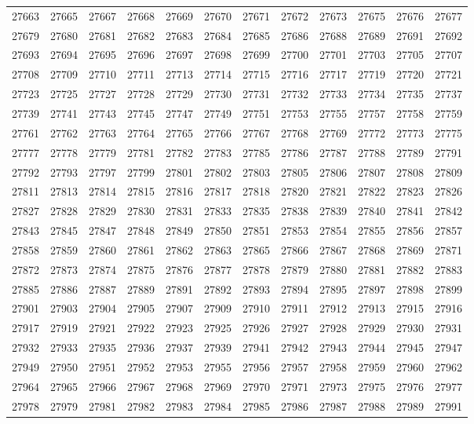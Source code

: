 \begin{center}
\begin{longtable}{llllllllllll}
27663 &27665 &27667 &27668 &27669 &27670 &27671 &27672 &27673 &27675 &27676 &27677 \\
27679 &27680 &27681 &27682 &27683 &27684 &27685 &27686 &27688 &27689 &27691 &27692 \\
27693 &27694 &27695 &27696 &27697 &27698 &27699 &27700 &27701 &27703 &27705 &27707 \\
27708 &27709 &27710 &27711 &27713 &27714 &27715 &27716 &27717 &27719 &27720 &27721 \\
27723 &27725 &27727 &27728 &27729 &27730 &27731 &27732 &27733 &27734 &27735 &27737 \\
27739 &27741 &27743 &27745 &27747 &27749 &27751 &27753 &27755 &27757 &27758 &27759 \\
27761 &27762 &27763 &27764 &27765 &27766 &27767 &27768 &27769 &27772 &27773 &27775 \\
27777 &27778 &27779 &27781 &27782 &27783 &27785 &27786 &27787 &27788 &27789 &27791 \\
27792 &27793 &27797 &27799 &27801 &27802 &27803 &27805 &27806 &27807 &27808 &27809 \\
27811 &27813 &27814 &27815 &27816 &27817 &27818 &27820 &27821 &27822 &27823 &27826 \\
27827 &27828 &27829 &27830 &27831 &27833 &27835 &27838 &27839 &27840 &27841 &27842 \\
27843 &27845 &27847 &27848 &27849 &27850 &27851 &27853 &27854 &27855 &27856 &27857 \\
27858 &27859 &27860 &27861 &27862 &27863 &27865 &27866 &27867 &27868 &27869 &27871 \\
27872 &27873 &27874 &27875 &27876 &27877 &27878 &27879 &27880 &27881 &27882 &27883 \\
27885 &27886 &27887 &27889 &27891 &27892 &27893 &27894 &27895 &27897 &27898 &27899 \\
27901 &27903 &27904 &27905 &27907 &27909 &27910 &27911 &27912 &27913 &27915 &27916 \\
27917 &27919 &27921 &27922 &27923 &27925 &27926 &27927 &27928 &27929 &27930 &27931 \\
27932 &27933 &27935 &27936 &27937 &27939 &27941 &27942 &27943 &27944 &27945 &27947 \\
27949 &27950 &27951 &27952 &27953 &27955 &27956 &27957 &27958 &27959 &27960 &27962 \\
27964 &27965 &27966 &27967 &27968 &27969 &27970 &27971 &27973 &27975 &27976 &27977 \\
27978 &27979 &27981 &27982 &27983 &27984 &27985 &27986 &27987 &27988 &27989 &27991 \\

\end{longtable}
\end{center}
